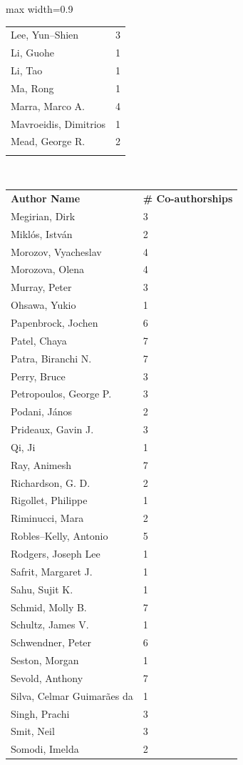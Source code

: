 \documentclass[a4paper,11pt, reqno]{amsart}
\begin{document}
{\begin{adjustbox}{max width=0.9\textwidth}
\begin{tabular}{l l}
Lee, Yun--Shien & 3 \\
Li, Guohe & 1 \\
Li, Tao & 1 \\
Ma, Rong & 1 \\
Marra, Marco A. & 4 \\
Mavroeidis, Dimitrios & 1 \\
Mead, George R. & 2 \\
&\\
\end{tabular}~\begin{tabular}{l l}
 {\bf Author Name} & {\bf \# Co-authorships} \\
 Megirian, Dirk & 3 \\
 Miklós, István & 2 \\
Morozov, Vyacheslav & 4 \\
Morozova, Olena & 4 \\
Murray, Peter & 3 \\
Ohsawa, Yukio & 1 \\
Papenbrock, Jochen & 6 \\
Patel, Chaya & 7 \\
Patra, Biranchi N. & 7 \\
Perry, Bruce & 3 \\
Petropoulos, George P. & 3 \\
Podani, János & 2 \\
Prideaux, Gavin J. & 3 \\
Qi, Ji & 1 \\
Ray, Animesh & 7 \\
Richardson, G. D. & 2 \\
Rigollet, Philippe & 1 \\
Riminucci, Mara & 2 \\
Robles--Kelly, Antonio & 5 \\
Rodgers, Joseph Lee & 1 \\
Safrit, Margaret J. & 1 \\
Sahu, Sujit K. & 1 \\
Schmid, Molly B. & 7 \\
Schultz, James V. & 1 \\
Schwendner, Peter & 6 \\
Seston, Morgan & 1 \\
Sevold, Anthony & 7 \\
Silva, Celmar Guimarães da & 1 \\
Singh, Prachi & 3 \\
Smit, Neil & 3 \\
Somodi, Imelda & 2 \\

\end{tabular}
\end{adjustbox}}
\end{document}
